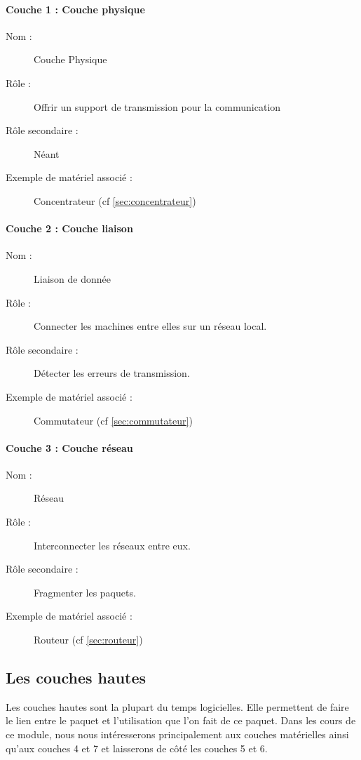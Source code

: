 \paragraph{Couche 1 : Couche physique}
\begin{description}
  \item [Nom : ] Couche Physique
  \item [Rôle : ] Offrir un support de transmission pour la communication
  \item [Rôle secondaire : ] Néant
  \item [Exemple de matériel associé : ] Concentrateur (cf \ref{sec:concentrateur})
\end{description}

\paragraph{Couche 2 : Couche liaison}
\begin{description}
  \item [Nom : ] Liaison de donnée
  \item [Rôle : ] Connecter les machines entre elles sur un réseau local.
  \item [Rôle secondaire : ] Détecter les erreurs de transmission.
  \item [Exemple de matériel associé : ] Commutateur (cf \ref{sec:commutateur})
\end{description}


\paragraph{Couche 3 : Couche réseau}
\begin{description}
  \item [Nom : ] Réseau
  \item [Rôle : ] Interconnecter les réseaux entre eux.
  \item [Rôle secondaire : ] Fragmenter les paquets.
  \item [Exemple de matériel associé : ] Routeur (cf \ref{sec:routeur})
\end{description}

\subsection{Les couches hautes}
Les couches hautes sont la plupart du temps logicielles. Elle permettent de faire le lien entre le paquet et l'utilisation que l'on fait de ce paquet. Dans les cours de ce module, nous nous intéresserons principalement aux couches matérielles ainsi qu'aux couches 4 et 7 et laisserons de côté les couches 5 et 6.

